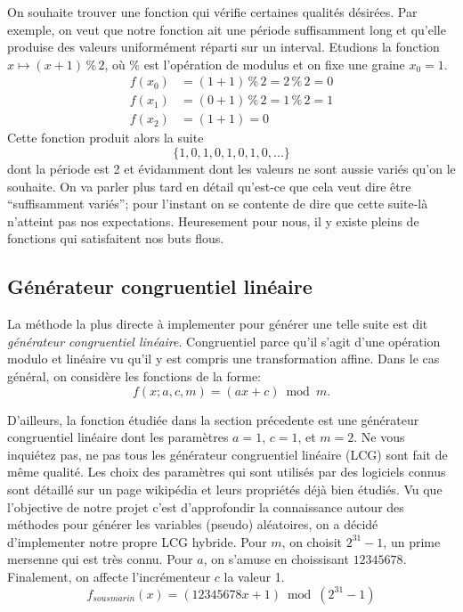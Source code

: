 \documentclass[10pt]{article} %
\begin{document}
On souhaite trouver une fonction qui vérifie certaines qualités désirées. Par exemple, on veut que notre fonction ait une période suffisamment long et qu'elle
produise des valeurs uniformément réparti sur un interval. Etudions la fonction $x \mapsto (x + 1) \mathbin{\%} 2$, où \% est l'opération de modulus et on fixe une graine $x_0 = 1$.
\begin{align*}
    f(x_0) &= (1 + 1) \mathbin{\%} 2 = 2 \mathbin{\%} 2 = 0 \\
    f(x_1) &= (0 + 1) \mathbin{\%} 2 = 1 \mathbin{\%} 2 = 1 \\
    f(x_2) &= (1 + 1) = 0
\end{align*}
Cette fonction produit alors la suite
\begin{equation*}
    \{1, 0, 1, 0, 1, 0, 1, 0, ...\}
\end{equation*}
dont la période est 2 et évidamment dont les valeurs ne sont aussie variés qu'on le souhaite. On va parler plus tard en détail qu'est-ce que cela veut dire être
``suffisamment variés''; pour l'instant on se contente de dire que cette suite-là n'atteint pas nos expectations. Heuresement pour nous, il y existe pleins de fonctions
qui satisfaitent nos buts flous.

\subsection{Générateur congruentiel linéaire}

La méthode la plus directe à implementer pour générer une telle suite est dit \textit{générateur congruentiel linéaire}. Congruentiel parce qu'il s'agit d'une opération modulo et
linéaire vu qu'il y est compris une transformation affine. Dans le cas général, on considère les fonctions de la forme:
$$
    f(x; a, c, m) = (ax + c) \bmod m.
$$

D'ailleurs, la fonction étudiée dans la section précedente est une générateur congruentiel linéaire dont les paramètres $a = 1$, $c = 1$, et $m = 2$. Ne vous inquiétez pas, ne pas tous les
générateur congruentiel linéaire (LCG) sont fait de même qualité. Les choix des paramètres qui sont utilisés par des logiciels connus sont détaillé sur un page wikipédia et leurs propriétés déjà
bien étudiés. Vu que l'objective de notre projet c'est d'approfondir la connaissance autour des méthodes pour générer les variables (pseudo) aléatoires, on a décidé d'implementer notre propre LCG hybride.
Pour $m$, on choisit $2^{31} - 1$, un prime mersenne qui est très connu. Pour $a$, on s'amuse en choissisant $12345678$. Finalement, on affecte l'incrémenteur $c$ la valeur 1.
$$
    f_{sousmarin}(x) = (12345678x + 1) \bmod (2^{31} - 1)
$$
\end{document}
